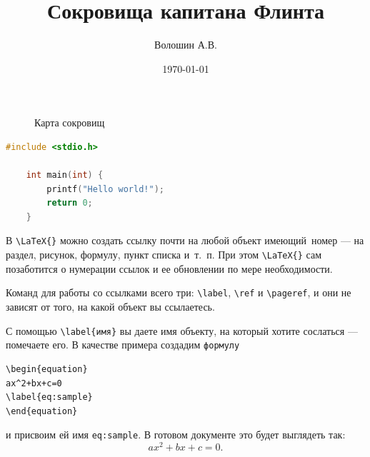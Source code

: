 \documentclass[a4paper,12pt]{article}
\title{Сокровища капитана Флинта}
\author{Волошин А.В.}
\date{\today} %
\begin{document}
\maketitle

\begin{figure}[h]
    \caption{Карта сокровищ}
    \label{fig:image}
\end{figure}

\begin{lstlisting}[language=C++,caption=Код для поиска сокровищ]
    #include <stdio.h>
    
    int main(int) {
        printf("Hello world!");
        return 0;
    }
\end{lstlisting}

\hfill

В \verb|\LaTeX{}| можно создать ссылку почти на любой объект имеющий~номер --- на раздел, рисунок, формулу, пункт списка и~т.~п. При этом \verb|\LaTeX{}| сам позаботится о нумерации ссылок и ее обновлении по мере необходимости.

Команд для работы со ссылками всего три: \verb|\label|, \verb|\ref| и \verb|\pageref|, и они не зависят от того, на какой объект вы ссылаетесь.

С помощью \verb|\label{имя}| вы даете имя объекту, на который хотите сослаться --- помечаете его. В качестве примера создадим \verb|формулу|
\begin{verbatim}
\begin{equation}
ax^2+bx+c=0
\label{eq:sample}
\end{equation}
\end{verbatim}
и присвоим ей имя \verb|eq:sample|. В готовом документе это будет выглядеть так:
\begin{equation}
    ax^2+bx+c=0.
    \label{eq:sample}
\end{equation}
\end{document}
